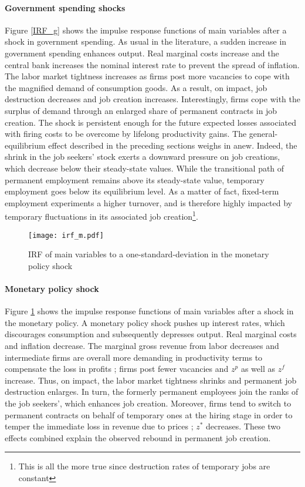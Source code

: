 \paragraph{Government spending shocks} Figure \ref{IRF_g} shows the impulse response functions of main variables after a shock in government spending. As usual in the literature, a sudden increase in government spending enhances output. Real marginal costs increase and the central bank increases the nominal interest rate to prevent the spread of inflation. The labor market tightness increases as firms post more vacancies to cope with the magnified demand of consumption goods. As a result, on impact, job destruction decreases and job creation increases. Interestingly, firms cope with the surplus of demand through an enlarged share of permanent contracts in job creation. The shock is persistent enough for the future expected losses associated with firing costs to be overcome by lifelong productivity gains. The general-equilibrium effect described in the preceding sections weighs in anew. Indeed, the shrink in the job seekers' stock exerts a downward pressure on job creations, which decrease below their steady-state values. While the transitional path of permanent employment remains above its steady-state value, temporary employment goes below its equilibrium level. As a matter of fact, fixed-term employment experiments a higher turnover, and is therefore highly impacted by temporary fluctuations in its associated job creation\footnote{This is all the more true since destruction rates of temporary jobs are constant}.

\begin{figure}[t]
\texttt{[image: irf\_m.pdf]}
\caption{IRF of main variables to a one-standard-deviation in the monetary policy shock}
\label{IRF_m}
\end{figure}

\paragraph{Monetary policy shock} Figure \ref{IRF_m} shows the impulse response functions of main variables after a shock in the monetary policy. A monetary policy shock pushes up interest rates, which discourages consumption and subsequently depresses output. Real marginal costs and inflation decrease. The marginal gross revenue from labor decreases and intermediate firms are overall more demanding in productivity terms to compensate the loss in profits ; firms post fewer vacancies and $z^p$ as well as $z^f$ increase. Thus, on impact, the labor market tightness shrinks and permanent job destruction enlarges. In turn, the formerly permanent employees join the ranks of the job seekers', which enhances job creation. Moreover, firms tend to switch to permanent contracts on behalf of temporary ones at the hiring stage in order to temper the immediate loss in revenue due to prices ; $z^*$ decreases. These two effects combined explain the observed rebound in permanent job creation.

